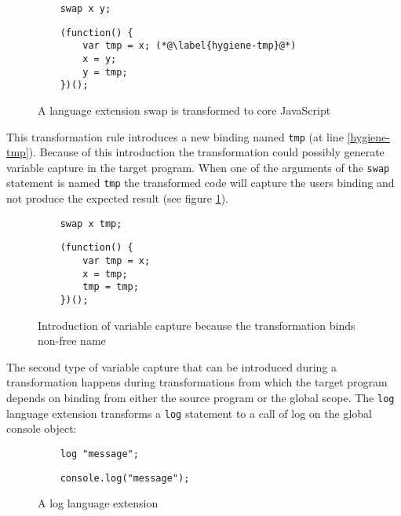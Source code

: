 \begin{figure}[!h]
\begin{minipage}{0.45\textwidth}
	\begin{lstlisting}
	swap x y;
	\end{lstlisting}
\end{minipage}
\hfill
\begin{minipage}{0.45\textwidth}
	\begin{lstlisting}
	(function() {
		var tmp = x; (*@\label{hygiene-tmp}@*)
		x = y;
		y = tmp;
	})();
	\end{lstlisting}
\end{minipage}

\caption{A language extension swap is transformed to core JavaScript}
\end{figure}

This transformation rule introduces a new binding named \lstinline$tmp$ (at line \ref{hygiene-tmp}). Because of this introduction the transformation could possibly generate variable capture in the target program. When one of the arguments of the \lstinline$swap$ statement is named \lstinline$tmp$ the transformed code will capture the users binding and not produce the expected result (see figure \ref{fig:unhygienic}).

\begin{figure}[!h]
\label{fig:unhygienic}
\begin{minipage}{0.45\textwidth}
	\begin{lstlisting}
	swap x tmp;
	\end{lstlisting}
\end{minipage}
\hfill
\begin{minipage}{0.45\textwidth}
	\begin{lstlisting}
	(function() {
		var tmp = x;
		x = tmp;
		tmp = tmp;
	})();
	\end{lstlisting}
\end{minipage}
\caption{Introduction of variable capture because the transformation binds non-free name} \label{fig:unhygienic}
\end{figure}

The second type of variable capture that can be introduced during a transformation happens during transformations from which the target program depends on binding from either the source program or the global scope. The \lstinline$log$ language extension transforms a \lstinline$log$ statement to a call of log on the global console object:

\begin{figure}[!h]
\begin{minipage}{0.45\textwidth}
	\begin{lstlisting}
	log "message";
	\end{lstlisting}
\end{minipage}
\hfill
\begin{minipage}{0.45\textwidth}
	\begin{lstlisting}
	console.log("message");
	\end{lstlisting}
\end{minipage}
\caption{A log language extension}
\end{figure}

